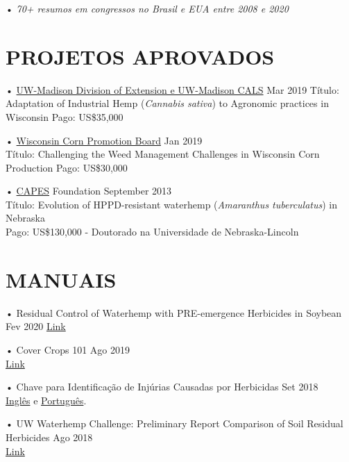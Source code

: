 \documentclass[11pt,]{article}
\begin{document}
• \emph{70+ resumos em congressos no Brasil e EUA entre 2008 e 2020}

\hypertarget{projetos-aprovados}{%
\section{PROJETOS APROVADOS}\label{projetos-aprovados}}

• \href{https://oeo.cals.wisc.edu}{UW-Madison Division of Extension e
UW-Madison CALS} \hfill Mar 2019 Título: Adaptation of Industrial Hemp
(\emph{Cannabis sativa}) to Agronomic practices in Wisconsin Pago:
US\$35,000

• \href{http://wicorn.org}{Wisconsin Corn Promotion Board} \hfill Jan
2019\\
Título: Challenging the Weed Management Challenges in Wisconsin Corn
Production Pago: US\$30,000

• \href{http://www.capes.gov.br/}{CAPES} Foundation \hfill September
2013\\
Título: Evolution of HPPD-resistant waterhemp (\emph{Amaranthus
tuberculatus}) in Nebraska\\
Pago: US\$130,000 - Doutorado na Universidade de Nebraska-Lincoln

\hypertarget{manuais}{%
\section{MANUAIS}\label{manuais}}

• Residual Control of Waterhemp with PRE-emergence Herbicides in Soybean
\hfill Fev 2020
\href{http://www.wiscweeds.info/img/2018\%202019\%20waterhemp\%20challenge/PreEmergence_waterhempFINAL.pdf}{Link}

• Cover Crops 101 \hfill Ago 2019\\
\href{https://learningstore.extension.wisc.edu/collections/farming/products/cover-crops-101}{Link}

• Chave para Identificação de Injúrias Causadas por Herbicidas
\hfill Set 2018\\
\href{http://www.wiscweeds.info/img/2018\%20Herbicide\%20SOA\%20injury\%20chart/2018_HerbicideInjury_EN.pdf}{Inglês}
e
\href{https://maxweeds.rbind.io/files/Herbicide\%20chart/2018_HerbicideInjury_BRA.pdf}{Português}.

• UW Waterhemp Challenge: Preliminary Report Comparison of Soil Residual
Herbicides \hfill Ago 2018\\
\href{http://www.wiscweeds.info/img/2018\%20waterhemp\%20challenge/Waterhemp\%20Management\%20PRE\%20Comparison_Lancaster\%20WI\%202018.pdf}{Link}
\end{document}
